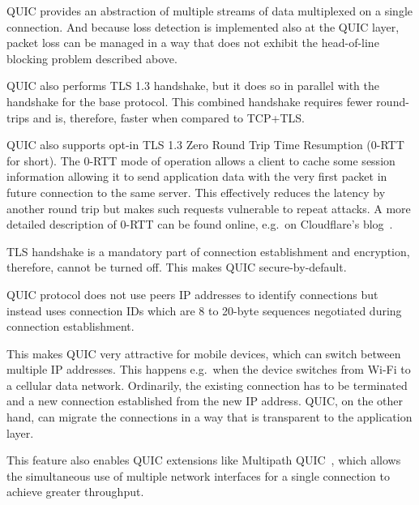 \begin{itemize}
   QUIC provides an abstraction of multiple streams of data multiplexed
    on a single connection. And because loss detection is implemented also at the QUIC layer, packet
    loss can be managed in a way that does not exhibit the head-of-line blocking problem described
    above.

   QUIC also performs TLS 1.3 handshake, but it does so in
    parallel with the handshake for the base protocol. This combined handshake requires fewer
    round-trips and is, therefore, faster when compared to TCP+TLS\@.

    QUIC also supports opt-in TLS 1.3 Zero Round Trip Time Resumption (0-RTT for short). The 0-RTT
    mode of operation allows a client to cache some session information allowing it to send
    application data with the very first packet in future connection to the same server. This
    effectively reduces the latency by another round trip but makes such requests vulnerable to
    repeat attacks. A more detailed description of 0-RTT can be found online, e.g.\ on Cloudflare's
    blog~\cite{cloudflare-0rtt}.

   TLS handshake is a mandatory part of connection establishment and
    encryption, therefore, cannot be turned off. This makes QUIC secure-by-default.

   QUIC protocol does not use peers
    IP addresses to identify connections but instead uses connection IDs which are 8 to 20-byte
    sequences negotiated during connection establishment.

    This makes QUIC very attractive for mobile devices, which can switch between multiple IP
    addresses. This happens e.g.\ when the device switches from Wi-Fi to a cellular data network.
    Ordinarily, the existing connection has to be terminated and a new connection established from
    the new IP address. QUIC, on the other hand, can migrate the connections in a way that is
    transparent to the application layer.

    This feature also enables QUIC extensions like Multipath
    QUIC~\cite{draft-deconinck-quic-multipath-04}, which allows the simultaneous use of multiple
    network interfaces for a single connection to achieve greater throughput.

\end{itemize}

